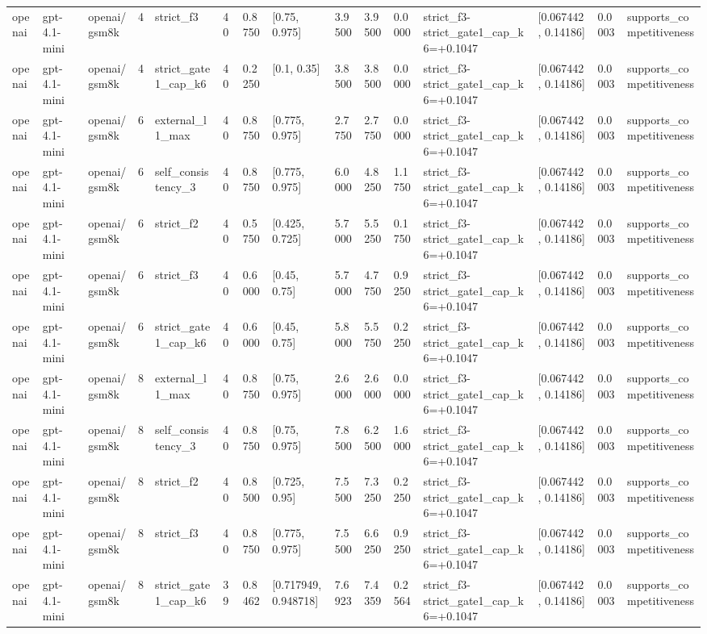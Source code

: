 \begin{tabular}{lllllllllllllll}
openai & gpt-4.1-mini & openai/gsm8k & 4 & strict\_f3 & 40 & 0.8750 & [0.75, 0.975] & 3.9500 & 3.9500 & 0.0000 & strict\_f3-strict\_gate1\_cap\_k6=+0.1047 & [0.067442, 0.14186] & 0.0003 & supports\_competitiveness \\
openai & gpt-4.1-mini & openai/gsm8k & 4 & strict\_gate1\_cap\_k6 & 40 & 0.2250 & [0.1, 0.35] & 3.8500 & 3.8500 & 0.0000 & strict\_f3-strict\_gate1\_cap\_k6=+0.1047 & [0.067442, 0.14186] & 0.0003 & supports\_competitiveness \\
openai & gpt-4.1-mini & openai/gsm8k & 6 & external\_l1\_max & 40 & 0.8750 & [0.775, 0.975] & 2.7750 & 2.7750 & 0.0000 & strict\_f3-strict\_gate1\_cap\_k6=+0.1047 & [0.067442, 0.14186] & 0.0003 & supports\_competitiveness \\
openai & gpt-4.1-mini & openai/gsm8k & 6 & self\_consistency\_3 & 40 & 0.8750 & [0.775, 0.975] & 6.0000 & 4.8250 & 1.1750 & strict\_f3-strict\_gate1\_cap\_k6=+0.1047 & [0.067442, 0.14186] & 0.0003 & supports\_competitiveness \\
openai & gpt-4.1-mini & openai/gsm8k & 6 & strict\_f2 & 40 & 0.5750 & [0.425, 0.725] & 5.7000 & 5.5250 & 0.1750 & strict\_f3-strict\_gate1\_cap\_k6=+0.1047 & [0.067442, 0.14186] & 0.0003 & supports\_competitiveness \\
openai & gpt-4.1-mini & openai/gsm8k & 6 & strict\_f3 & 40 & 0.6000 & [0.45, 0.75] & 5.7000 & 4.7750 & 0.9250 & strict\_f3-strict\_gate1\_cap\_k6=+0.1047 & [0.067442, 0.14186] & 0.0003 & supports\_competitiveness \\
openai & gpt-4.1-mini & openai/gsm8k & 6 & strict\_gate1\_cap\_k6 & 40 & 0.6000 & [0.45, 0.75] & 5.8000 & 5.5750 & 0.2250 & strict\_f3-strict\_gate1\_cap\_k6=+0.1047 & [0.067442, 0.14186] & 0.0003 & supports\_competitiveness \\
openai & gpt-4.1-mini & openai/gsm8k & 8 & external\_l1\_max & 40 & 0.8750 & [0.75, 0.975] & 2.6000 & 2.6000 & 0.0000 & strict\_f3-strict\_gate1\_cap\_k6=+0.1047 & [0.067442, 0.14186] & 0.0003 & supports\_competitiveness \\
openai & gpt-4.1-mini & openai/gsm8k & 8 & self\_consistency\_3 & 40 & 0.8750 & [0.75, 0.975] & 7.8500 & 6.2500 & 1.6000 & strict\_f3-strict\_gate1\_cap\_k6=+0.1047 & [0.067442, 0.14186] & 0.0003 & supports\_competitiveness \\
openai & gpt-4.1-mini & openai/gsm8k & 8 & strict\_f2 & 40 & 0.8500 & [0.725, 0.95] & 7.5500 & 7.3250 & 0.2250 & strict\_f3-strict\_gate1\_cap\_k6=+0.1047 & [0.067442, 0.14186] & 0.0003 & supports\_competitiveness \\
openai & gpt-4.1-mini & openai/gsm8k & 8 & strict\_f3 & 40 & 0.8750 & [0.775, 0.975] & 7.5500 & 6.6250 & 0.9250 & strict\_f3-strict\_gate1\_cap\_k6=+0.1047 & [0.067442, 0.14186] & 0.0003 & supports\_competitiveness \\
openai & gpt-4.1-mini & openai/gsm8k & 8 & strict\_gate1\_cap\_k6 & 39 & 0.8462 & [0.717949, 0.948718] & 7.6923 & 7.4359 & 0.2564 & strict\_f3-strict\_gate1\_cap\_k6=+0.1047 & [0.067442, 0.14186] & 0.0003 & supports\_competitiveness \\
\hline
\end{tabular}
